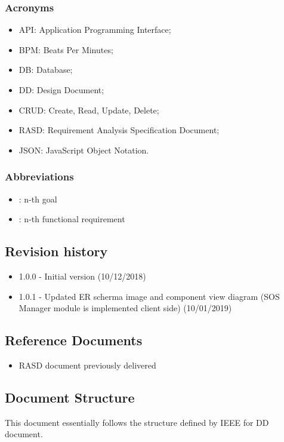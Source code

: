 \documentclass[DD.tex]{subfiles}
\begin{document}
\subsubsection{Acronyms}
\begin{itemize}
	\item API: Application Programming Interface;
	\item BPM: Beats Per Minutes;
	\item DB: Database;
	\item DD: Design Document;
	\item CRUD: Create, Read, Update, Delete;
	\item RASD: Requirement Analysis Specification Document;
	\item JSON: JavaScript Object Notation.
\end{itemize}

\subsubsection{Abbreviations}
\begin{itemize}
	\item \begin{math}[Gn]\end{math}: n-th goal
	\item \begin{math}[Rn]\end{math}: n-th functional requirement
\end{itemize}

\subsection{Revision history}
\begin{itemize}
		\item 1.0.0 - Initial version (10/12/2018)
		\item 1.0.1 - Updated ER scherma image and component view diagram (SOS Manager module is implemented client side) (10/01/2019)
\end{itemize}

\subsection{Reference Documents} 
\begin{itemize}
		\item RASD document previously delivered 
\end{itemize}

\subsection{Document Structure}
This document essentially follows the structure defined by IEEE for DD document.

\newpage
\end{document}
